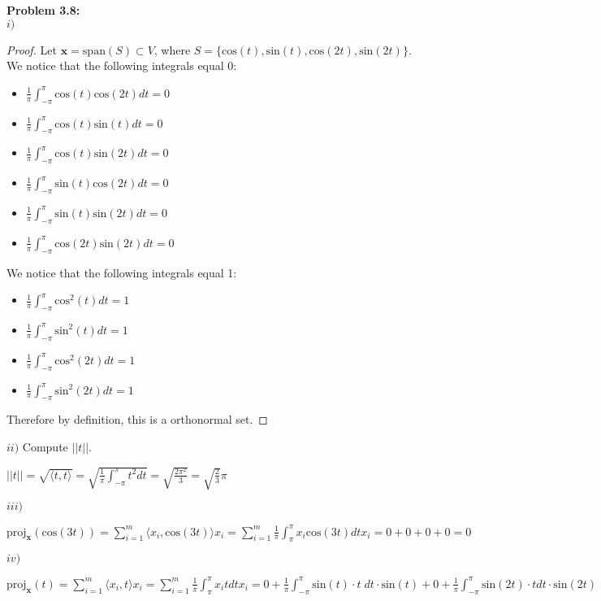 \documentclass[letterpaper,12pt]{article}
\theoremstyle{definition}
\begin{document}
\noindent\textbf{Problem 3.8:}\\
$i)$
\begin{proof} Let $\mathbf{x}= \mathrm{span}(S) \subset V$, where $S = \{\mathrm{cos}(t), \mathrm{sin}(t), \mathrm{cos}(2t), \mathrm{sin}(2t)\}$.  We notice that the following integrals equal 0: 
\begin{itemize}
	\item $\frac{1}{\pi} \int^{\pi}_{-\pi} \mathrm{cos}(t)\mathrm{cos}(2t) dt = 0$
	\item $\frac{1}{\pi} \int^{\pi}_{-\pi} \mathrm{cos}(t)\mathrm{sin}(t) dt = 0$
	\item $\frac{1}{\pi} \int^{\pi}_{-\pi} \mathrm{cos}(t)\mathrm{sin}(2t) dt = 0$
	\item $\frac{1}{\pi} \int^{\pi}_{-\pi} \mathrm{sin}(t)\mathrm{cos}(2t) dt = 0$
	\item $\frac{1}{\pi} \int^{\pi}_{-\pi} \mathrm{sin}(t)\mathrm{sin}(2t) dt = 0$
	\item $\frac{1}{\pi} \int^{\pi}_{-\pi} \mathrm{cos}(2t)\mathrm{sin}(2t) dt = 0$
\end{itemize}
\indent We notice that the following integrals equal 1:
\begin{itemize}
	\item $\frac{1}{\pi} \int^{\pi}_{-\pi} \mathrm{cos}^2(t)dt = 1$
	\item $\frac{1}{\pi} \int^{\pi}_{-\pi} \mathrm{sin}^2(t)dt = 1$
	\item $\frac{1}{\pi} \int^{\pi}_{-\pi} \mathrm{cos}^2(2t)dt = 1$
	\item $\frac{1}{\pi} \int^{\pi}_{-\pi} \mathrm{sin}^2(2t)dt = 1$
\end{itemize}
\noindent Therefore by definition, this is a orthonormal set.
\end{proof}
\noindent $ii)$ Compute $||t||$.  
\begin{center}
 $||t|| = \sqrt{\langle  t, t  \rangle  } = \sqrt{\frac{1}{\pi} \int^{\pi}_{-\pi} t^2 dt} = \sqrt{\frac{2\pi^2}{3}} = \sqrt{\frac{2}{3}}\pi$
\end{center}
\noindent $iii)$
\begin{center} $\mathrm{proj}_\mathbf{x}(\mathrm{cos}(3t)) = \sum_{i = 1}^m \langle  x_i,\mathrm{cos}(3t) \rangle   x_i = \sum^m_{i=1} \frac{1}{\pi} \int^{\pi}_{\pi} x_i \mathrm{cos}(3t) dt x_i = 0 + 0 + 0 + 0 = 0$ 
\end{center}
$iv)$
\begin{center} $\mathrm{proj}_\mathbf{x}(t) = \sum_{i = 1}^m \langle  x_i, t  \rangle   x_i = \sum^m_{i=1} \frac{1}{\pi} \int^{\pi}_{\pi} x_i t dt x_i = 0 + 
\frac{1}{\pi} \int^{\pi}_{-\pi} \mathrm{sin}(t)\cdot t \;dt  \cdot \mathrm{sin}(t)+ 0 + \frac{1}{\pi} \int^{\pi}_{-\pi} \mathrm{sin}(2t) \cdot t dt \cdot \mathrm{sin}(2t) = 2\mathrm{sin}(t) - \mathrm{sin}(2t)$
\end{center}
\end{document}
